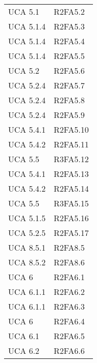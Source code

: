 {\begin{longtable}{ C{4cm} C{4cm}}
UCA 5.1 & R2FA5.2\\


UCA 5.1.4 & R2FA5.3\\

UCA 5.1.4 & R2FA5.4\\

UCA 5.1.4 & R2FA5.5\\

UCA 5.2 & R2FA5.6\\

UCA 5.2.4 & R2FA5.7\\

UCA 5.2.4 & R2FA5.8\\

UCA 5.2.4 & R2FA5.9\\

UCA 5.4.1 & R2FA5.10\\

UCA 5.4.2 & R2FA5.11\\


UCA 5.5 & R3FA5.12\\

UCA 5.4.1 & R2FA5.13\\

UCA 5.4.2 & R2FA5.14\\

UCA 5.5 & R3FA5.15\\

UCA 5.1.5 & R2FA5.16\\

UCA 5.2.5 & R2FA5.17\\

UCA 8.5.1 & R2FA8.5\\

UCA 8.5.2 & R2FA8.6\\

UCA 6 & R2FA6.1\\


UCA 6.1.1 & R2FA6.2\\

UCA 6.1.1 & R2FA6.3\\

UCA 6 & R2FA6.4\\

UCA 6.1 & R2FA6.5\\

UCA 6.2 & R2FA6.6\\


\end{longtable}}
